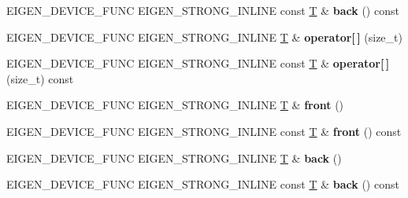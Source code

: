 \begin{DoxyCompactItemize}
\item 
\mbox{\label{class_eigen_1_1array_3_01_t_00_010_01_4_a8601aab02870ee62ed8bca7f5082fef0}} 
E\+I\+G\+E\+N\+\_\+\+D\+E\+V\+I\+C\+E\+\_\+\+F\+U\+NC E\+I\+G\+E\+N\+\_\+\+S\+T\+R\+O\+N\+G\+\_\+\+I\+N\+L\+I\+NE const \hyperlink{group___sparse_core___module}{T} \& {\bfseries back} () const
\item 
\mbox{\label{class_eigen_1_1array_3_01_t_00_010_01_4_a37c62e5ec4b7ea518711ef63c3381d47}} 
E\+I\+G\+E\+N\+\_\+\+D\+E\+V\+I\+C\+E\+\_\+\+F\+U\+NC E\+I\+G\+E\+N\+\_\+\+S\+T\+R\+O\+N\+G\+\_\+\+I\+N\+L\+I\+NE \hyperlink{group___sparse_core___module}{T} \& {\bfseries operator\mbox{[}$\,$\mbox{]}} (size\+\_\+t)
\item 
\mbox{\label{class_eigen_1_1array_3_01_t_00_010_01_4_a276c1f31385f03d9c03df6a859bcb6c2}} 
E\+I\+G\+E\+N\+\_\+\+D\+E\+V\+I\+C\+E\+\_\+\+F\+U\+NC E\+I\+G\+E\+N\+\_\+\+S\+T\+R\+O\+N\+G\+\_\+\+I\+N\+L\+I\+NE const \hyperlink{group___sparse_core___module}{T} \& {\bfseries operator\mbox{[}$\,$\mbox{]}} (size\+\_\+t) const
\item 
\mbox{\label{class_eigen_1_1array_3_01_t_00_010_01_4_a665ea311f514508fcba9084b39d38f21}} 
E\+I\+G\+E\+N\+\_\+\+D\+E\+V\+I\+C\+E\+\_\+\+F\+U\+NC E\+I\+G\+E\+N\+\_\+\+S\+T\+R\+O\+N\+G\+\_\+\+I\+N\+L\+I\+NE \hyperlink{group___sparse_core___module}{T} \& {\bfseries front} ()
\item 
\mbox{\label{class_eigen_1_1array_3_01_t_00_010_01_4_a75685c5ac8ff4d88eb037da85b27531a}} 
E\+I\+G\+E\+N\+\_\+\+D\+E\+V\+I\+C\+E\+\_\+\+F\+U\+NC E\+I\+G\+E\+N\+\_\+\+S\+T\+R\+O\+N\+G\+\_\+\+I\+N\+L\+I\+NE const \hyperlink{group___sparse_core___module}{T} \& {\bfseries front} () const
\item 
\mbox{\label{class_eigen_1_1array_3_01_t_00_010_01_4_ae60d3aaa550a38bc33216b68d9e20f78}} 
E\+I\+G\+E\+N\+\_\+\+D\+E\+V\+I\+C\+E\+\_\+\+F\+U\+NC E\+I\+G\+E\+N\+\_\+\+S\+T\+R\+O\+N\+G\+\_\+\+I\+N\+L\+I\+NE \hyperlink{group___sparse_core___module}{T} \& {\bfseries back} ()
\item 
\mbox{\label{class_eigen_1_1array_3_01_t_00_010_01_4_a8601aab02870ee62ed8bca7f5082fef0}} 
E\+I\+G\+E\+N\+\_\+\+D\+E\+V\+I\+C\+E\+\_\+\+F\+U\+NC E\+I\+G\+E\+N\+\_\+\+S\+T\+R\+O\+N\+G\+\_\+\+I\+N\+L\+I\+NE const \hyperlink{group___sparse_core___module}{T} \& {\bfseries back} () const
\end{DoxyCompactItemize}
